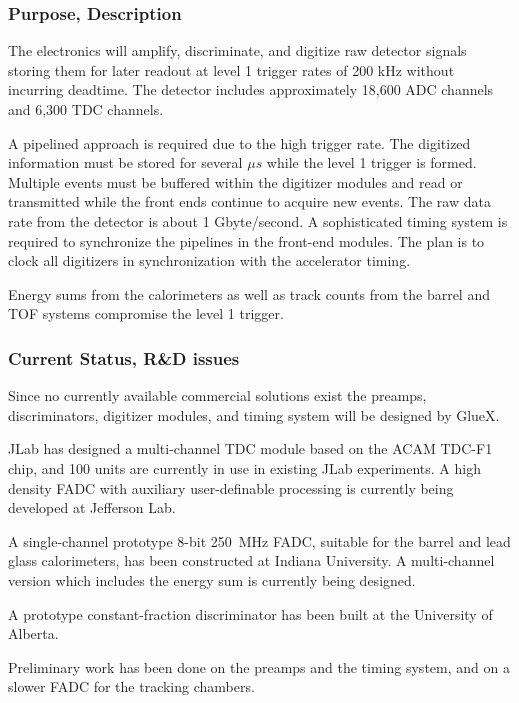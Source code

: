 \subsubsection*{Purpose, Description}

The electronics will amplify, discriminate, and digitize raw detector signals
storing them for later readout at level 1 trigger rates of 200 kHz
without incurring deadtime.  The detector includes
approximately 18,600 ADC channels and 6,300 TDC channels.

A pipelined approach is required due to the high trigger rate.  The
digitized information must be stored for several $ \mu s $ while the
level 1 trigger is formed.  Multiple events must be buffered within
the digitizer modules and read or transmitted while the front ends continue to
acquire new events.  The raw data rate from the detector is about 1
Gbyte/second. A sophisticated timing system is required to synchronize the
pipelines in the front-end modules.  The plan is to clock all digitizers in synchronization
with the accelerator timing.

Energy sums from the calorimeters as well as track counts from the barrel and TOF systems
compromise the level 1 trigger.



\subsubsection*{Current Status, R\&D issues}


Since no currently available commercial solutions exist the 
preamps, discriminators, digitizer modules, and timing system
will be designed by GlueX.

JLab has designed a multi-channel TDC module based on the ACAM TDC-F1
chip, and 100 units are currently in use in existing JLab experiments.  A high density
FADC with auxiliary user-definable processing is currently being developed at
Jefferson Lab.

A single-channel prototype 8-bit 250~MHz FADC, suitable for the barrel
and lead glass calorimeters, has been constructed at Indiana
University.  A multi-channel version which includes the energy sum is
currently being designed.

 A prototype constant-fraction discriminator has been built at the University of Alberta.

Preliminary work has been done on the preamps and
the timing system, and on a slower FADC for the tracking chambers.




